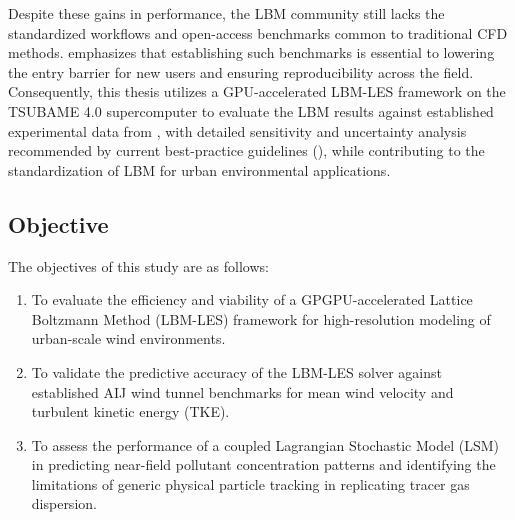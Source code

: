 Despite these gains in performance, the LBM community still lacks the standardized workflows and open-access benchmarks common to traditional CFD methods. \textcite{Hu2025} emphasizes that establishing such benchmarks is essential to lowering the entry barrier for new users and ensuring reproducibility across the field. Consequently, this thesis utilizes a GPU-accelerated LBM-LES framework on the TSUBAME 4.0 supercomputer to evaluate the LBM results against established experimental data from \textcite{AIJCaseH}, with detailed sensitivity and uncertainty analysis recommended by current best-practice guidelines (\cite{Tominaga2024Review, Okaze2021LES}), while contributing to the standardization of LBM for urban environmental applications.

\newpage
\subsection{Objective}
The objectives of this study are as follows:
\begin{enumerate}
    \item To evaluate the efficiency and viability of a GPGPU-accelerated Lattice Boltzmann Method (LBM-LES) framework for high-resolution modeling of urban-scale wind environments.

    \item To validate the predictive accuracy of the LBM-LES solver against established AIJ wind tunnel benchmarks for mean wind velocity and turbulent kinetic energy (TKE).
    
    \item To assess the performance of a coupled Lagrangian Stochastic Model (LSM) in predicting near-field pollutant concentration patterns and identifying the limitations of generic physical particle tracking in replicating tracer gas dispersion.

\end{enumerate}


\newpage
